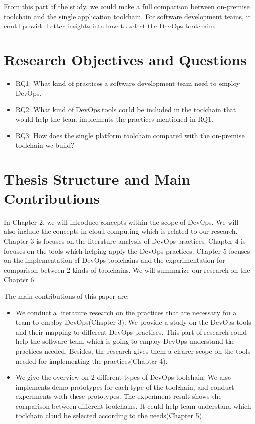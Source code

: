 From this part of the study, we could make a full comparison between on-premise toolchain and the single application toolchain. For software development teams, it could provide better insights into how to select the DevOps toolchains.
\section{Research Objectives and Questions}
\begin{itemize}
    \item RQ1: What kind of practices a software development team need to employ DevOps.
    \item RQ2: What kind of DevOps tools could be included in the toolchain that would help the team implements the practices mentioned in RQ1.
    \item RQ3: How does the single platform toolchain compared with the on-premise toolchain we build?
\end{itemize}
\section{Thesis Structure and Main Contributions}
In Chapter 2, we will introduce concepts within the scope of DevOps. We will also include the concepts in cloud computing which is related to our research. Chapter 3 is focuses on the literature analysis of DevOps practices. Chapter 4 is focuses on the tools which helping apply the DevOps practices. Chapter 5 focuses on the implementation of DevOps toolchains and the experimentation for comparison between 2 kinds of toolchains. We will summarize our research on the Chapter 6.
\par
The main contributions of this paper are:
\begin{itemize}
    \item We conduct a literature research on the practices that are necessary for a team to employ DevOps(Chapter 3). We provide a study on the DevOps tools and their mapping to different DevOps practices. This part of research could help the software team which is going to employ DevOps understand the practices needed. Besides, the research gives them a clearer scope on the tools needed for implementing the practices(Chapter 4).
    \item We give the overview on 2 different types of DevOps toolchain. We also implements demo prototypes for each type of the toolchain, and conduct experiments with these prototypes. The experiment result shows the comparison between different toolchains. It could help team understand which toolchain cloud be selected according to the needs(Chapter 5).
\end{itemize}
